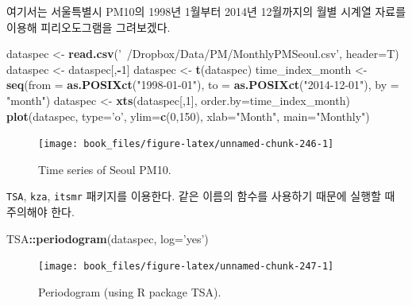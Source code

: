 \documentclass[b5paper,]{scrbook}
\makeatletter
\newenvironment{Shaded}{\begin{snugshade}}{\end{snugshade}}
\newcommand{\DataTypeTok}[1]{\textcolor[rgb]{0.13,0.29,0.53}{#1}}
\newcommand{\DecValTok}[1]{\textcolor[rgb]{0.00,0.00,0.81}{#1}}
\newcommand{\KeywordTok}[1]{\textcolor[rgb]{0.13,0.29,0.53}{\textbf{#1}}}
\newcommand{\NormalTok}[1]{#1}
\newcommand{\OperatorTok}[1]{\textcolor[rgb]{0.81,0.36,0.00}{\textbf{#1}}}
\newcommand{\StringTok}[1]{\textcolor[rgb]{0.31,0.60,0.02}{#1}}
\theoremstyle{plain}
\theoremstyle{definition}
\numberwithin{equation}{section}
\newenvironment{kframe}{%
\medskip{}
\setlength{\fboxsep}{.8em}
 \def\at@end@of@kframe{}%
 \ifinner\ifhmode%
  \def\at@end@of@kframe{\end{minipage}}%
  \begin{minipage}{\columnwidth}%
 \fi\fi%
 \def\FrameCommand##1{\hskip\@totalleftmargin \hskip-\fboxsep
 \colorbox{shadecolor}{##1}\hskip-\fboxsep
     \hskip-\linewidth \hskip-\@totalleftmargin \hskip\columnwidth}%
 \MakeFramed {\advance\hsize-\width
   \@totalleftmargin\z@ \linewidth\hsize
   \@setminipage}}%
 {\par\unskip\endMakeFramed%
 \at@end@of@kframe}
\renewenvironment{Shaded}{\begin{kframe}}{\end{kframe}}
\makeatother
\begin{document}
여기서는 서울특별시 PM10의 1998년 1월부터 2014년 12월까지의 월별 시계열 자료를 이용해 피리오도그램을 그려보겠다.

\begin{Shaded}
\begin{Highlighting}[]
\NormalTok{dataspec <-}\StringTok{ }\KeywordTok{read.csv}\NormalTok{(}\StringTok{'~/Dropbox/Data/PM/MonthlyPMSeoul.csv'}\NormalTok{, }\DataTypeTok{header=}\NormalTok{T)}
\NormalTok{dataspec <-}\StringTok{ }\NormalTok{dataspec[,}\OperatorTok{-}\DecValTok{1}\NormalTok{]}
\NormalTok{dataspec <-}\StringTok{ }\KeywordTok{t}\NormalTok{(dataspec)}
\NormalTok{time_index_month <-}\StringTok{ }\KeywordTok{seq}\NormalTok{(}\DataTypeTok{from =} \KeywordTok{as.POSIXct}\NormalTok{(}\StringTok{"1998-01-01"}\NormalTok{), }\DataTypeTok{to =} \KeywordTok{as.POSIXct}\NormalTok{(}\StringTok{"2014-12-01"}\NormalTok{), }\DataTypeTok{by =} \StringTok{"month"}\NormalTok{)}
\NormalTok{dataspec <-}\StringTok{ }\KeywordTok{xts}\NormalTok{(dataspec[,}\DecValTok{1}\NormalTok{], }\DataTypeTok{order.by=}\NormalTok{time_index_month)}
\KeywordTok{plot}\NormalTok{(dataspec, }\DataTypeTok{type=}\StringTok{'o'}\NormalTok{, }\DataTypeTok{ylim=}\KeywordTok{c}\NormalTok{(}\DecValTok{0}\NormalTok{,}\DecValTok{150}\NormalTok{), }\DataTypeTok{xlab=}\StringTok{"Month"}\NormalTok{, }\DataTypeTok{main=}\StringTok{"Monthly"}\NormalTok{)}
\end{Highlighting}
\end{Shaded}

\begin{figure}

{\centering \texttt{[image: book\_files/figure-latex/unnamed-chunk-246-1]} 

}

\caption{Time series of Seoul PM10.}\label{fig:unnamed-chunk-246}
\end{figure}

\texttt{TSA}, \texttt{kza}, \texttt{itsmr} 패키지를 이용한다. 같은 이름의 함수를 사용하기 때문에 실행할 때 주의해야 한다.

\begin{Shaded}
\begin{Highlighting}[]
\NormalTok{TSA}\OperatorTok{::}\KeywordTok{periodogram}\NormalTok{(dataspec, }\DataTypeTok{log=}\StringTok{'yes'}\NormalTok{)}
\end{Highlighting}
\end{Shaded}

\begin{figure}

{\centering \texttt{[image: book\_files/figure-latex/unnamed-chunk-247-1]} 

}

\caption{Periodogram (using R package TSA).}\label{fig:unnamed-chunk-247}
\end{figure}
\end{document}
